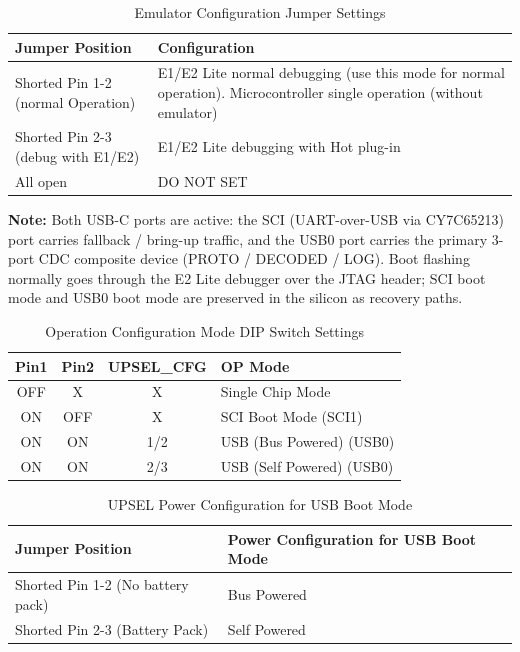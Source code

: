 \begin{table}[H]
\centering
\caption{Emulator Configuration Jumper Settings}
\label{tab:emulator-config}
\begin{tabular}{
  | p{6cm} | p{8cm} |}
\hline
\textbf{Jumper Position} & \textbf{Configuration} \\
\hline
Shorted Pin 1-2 (normal Operation) & E1/E2 Lite normal debugging (use this mode for normal operation). Microcontroller single operation (without emulator) \\
\hline
Shorted Pin 2-3 (debug with E1/E2) & E1/E2 Lite debugging with Hot plug-in \\
\hline
All open & DO NOT SET \\
\hline
\end{tabular}
\end{table}

\begin{table}[H]
\centering
\caption{Operation Configuration Mode DIP Switch Settings}
\label{tab:op-mode-config}
\small
\textbf{Note:} Both USB-C ports are active: the SCI (UART-over-USB via CY7C65213) port carries fallback / bring-up traffic, and the USB0 port carries the primary 3-port CDC composite device (PROTO / DECODED / LOG). Boot flashing normally goes through the E2 Lite debugger over the JTAG header; SCI boot mode and USB0 boot mode are preserved in the silicon as recovery paths.

\vspace{0.2cm}

\begin{tabular}{|c|c|c|l|}
\hline
\textbf{Pin1} & \textbf{Pin2} & \textbf{UPSEL\_CFG} & \textbf{OP Mode} \\
\hline
OFF & X & X & Single Chip Mode \\
\hline
ON & OFF & X & SCI Boot Mode (SCI1) \\
\hline
ON & ON & 1/2 & USB (Bus Powered) (USB0) \\
\hline
ON & ON & 2/3 & USB (Self Powered) (USB0) \\
\hline
\end{tabular}
\end{table}

\begin{table}[H]
\centering
\caption{UPSEL Power Configuration for USB Boot Mode}
\label{tab:upsel-config}
\begin{tabular}{|l|l|}
\hline
\textbf{Jumper Position} & \textbf{Power Configuration for USB Boot Mode} \\
\hline
Shorted Pin 1-2 (No battery pack) & Bus Powered \\
\hline
Shorted Pin 2-3 (Battery Pack) & Self Powered \\
\hline
\end{tabular}
\end{table}

